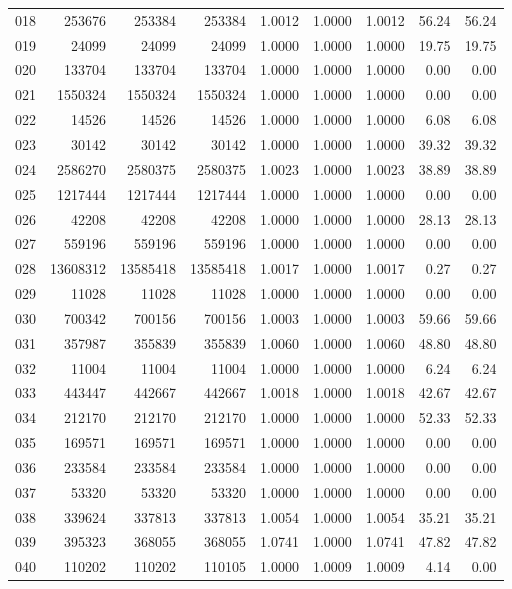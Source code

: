 \begin{longtable}{crrrrrrrr}
018 & 253676 & 253384 & 253384 & 1.0012 & 1.0000 & 1.0012 & 56.24 & 56.24 \\
019 & 24099 & 24099 & 24099 & 1.0000 & 1.0000 & 1.0000 & 19.75 & 19.75 \\
020 & 133704 & 133704 & 133704 & 1.0000 & 1.0000 & 1.0000 & 0.00 & 0.00 \\
021 & 1550324 & 1550324 & 1550324 & 1.0000 & 1.0000 & 1.0000 & 0.00 & 0.00 \\
022 & 14526 & 14526 & 14526 & 1.0000 & 1.0000 & 1.0000 & 6.08 & 6.08 \\
023 & 30142 & 30142 & 30142 & 1.0000 & 1.0000 & 1.0000 & 39.32 & 39.32 \\
024 & 2586270 & 2580375 & 2580375 & 1.0023 & 1.0000 & 1.0023 & 38.89 & 38.89 \\
025 & 1217444 & 1217444 & 1217444 & 1.0000 & 1.0000 & 1.0000 & 0.00 & 0.00 \\
026 & 42208 & 42208 & 42208 & 1.0000 & 1.0000 & 1.0000 & 28.13 & 28.13 \\
027 & 559196 & 559196 & 559196 & 1.0000 & 1.0000 & 1.0000 & 0.00 & 0.00 \\
028 & 13608312 & 13585418 & 13585418 & 1.0017 & 1.0000 & 1.0017 & 0.27 & 0.27 \\
029 & 11028 & 11028 & 11028 & 1.0000 & 1.0000 & 1.0000 & 0.00 & 0.00 \\
030 & 700342 & 700156 & 700156 & 1.0003 & 1.0000 & 1.0003 & 59.66 & 59.66 \\
031 & 357987 & 355839 & 355839 & 1.0060 & 1.0000 & 1.0060 & 48.80 & 48.80 \\
032 & 11004 & 11004 & 11004 & 1.0000 & 1.0000 & 1.0000 & 6.24 & 6.24 \\
033 & 443447 & 442667 & 442667 & 1.0018 & 1.0000 & 1.0018 & 42.67 & 42.67 \\
034 & 212170 & 212170 & 212170 & 1.0000 & 1.0000 & 1.0000 & 52.33 & 52.33 \\
035 & 169571 & 169571 & 169571 & 1.0000 & 1.0000 & 1.0000 & 0.00 & 0.00 \\
036 & 233584 & 233584 & 233584 & 1.0000 & 1.0000 & 1.0000 & 0.00 & 0.00 \\
037 & 53320 & 53320 & 53320 & 1.0000 & 1.0000 & 1.0000 & 0.00 & 0.00 \\
038 & 339624 & 337813 & 337813 & 1.0054 & 1.0000 & 1.0054 & 35.21 & 35.21 \\
039 & 395323 & 368055 & 368055 & 1.0741 & 1.0000 & 1.0741 & 47.82 & 47.82 \\
040 & 110202 & 110202 & 110105 & 1.0000 & 1.0009 & 1.0009 & 4.14 & 0.00 \\

\end{longtable}
